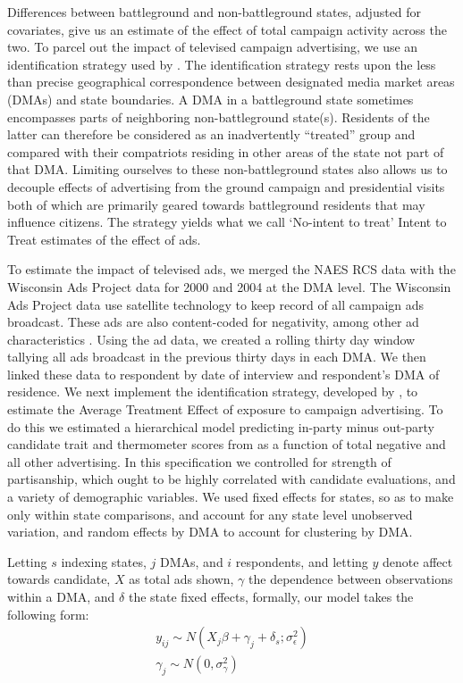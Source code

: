 \documentclass[12pt, letterpaper]{article}
\begin{document}
Differences between battleground and non-battleground states, adjusted for covariates, give us an estimate of the effect of total campaign activity across the two. To parcel out the impact of televised campaign advertising, we use an identification strategy used by \citet{huber2007}. The identification strategy rests upon the less than precise geographical correspondence between designated media market areas (DMAs) and state boundaries. A DMA in a battleground state sometimes encompasses parts of neighboring non-battleground state(s).  Residents of the latter can therefore be considered as an inadvertently ``treated'' group and compared with their compatriots residing in other areas of the state not part of that DMA. Limiting ourselves to these non-battleground states also allows us to decouple effects of advertising from the ground campaign and presidential visits \textemdash both of which are primarily geared towards battleground residents \textemdash that may influence citizens. The strategy yields what we call `No-intent to treat' Intent to Treat estimates of the effect of ads.

To estimate the impact of televised ads, we merged the NAES RCS data with the Wisconsin Ads Project data for 2000 and 2004 at the DMA level. The Wisconsin Ads Project data use satellite technology to keep record of all campaign ads broadcast. These ads are also content-coded for negativity, among other ad characteristics \citep[see][]{goldstein2007}. Using the ad data, we created a rolling thirty day window tallying all ads broadcast in the previous thirty days in each DMA. We then linked these data to respondent by date of interview and respondent's DMA of residence. We next implement the identification strategy, developed by \citet{huber2007}, to estimate the Average Treatment Effect of exposure to campaign advertising. To do this we estimated a hierarchical model predicting in-party minus out-party candidate trait and thermometer scores from as a function of total negative and all other advertising. In this specification we controlled for strength of partisanship,  which ought to be highly correlated with candidate evaluations, and a variety of demographic variables. We used fixed effects for states, so as to make only within state comparisons, and account for any state level unobserved variation, and random effects by DMA to account for clustering by DMA.

Letting $s$ indexing states, $j$ DMAs, and $i$ respondents, and letting $y$ denote affect towards candidate, $X$ as total ads shown, $\gamma$ the dependence between observations within a DMA, and $\delta$ the state fixed effects, formally, our model takes the following form:  
\begin{gather*}
  y_{ij}  \sim N(X_j\beta + \gamma_j + \delta_s; \sigma^2_{\epsilon}) \\
 \gamma_j  \sim N(0,\sigma^2_{\gamma})
\end{gather*}
\end{document}
